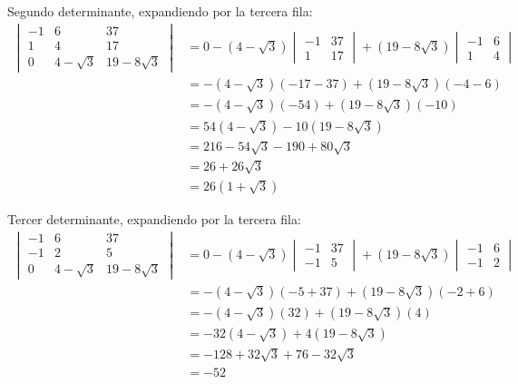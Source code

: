 \documentclass{article}
\begin{document}
Segundo determinante, expandiendo por la tercera fila:
\begin{align}
\begin{vmatrix}
-1 & 6 & 37 \\
1 & 4 & 17 \\
0 & 4-\sqrt{3} & 19-8\sqrt{3}
\end{vmatrix} &= 0 - (4-\sqrt{3}) \begin{vmatrix} -1 & 37 \\ 1 & 17 \end{vmatrix} + (19-8\sqrt{3}) \begin{vmatrix} -1 & 6 \\ 1 & 4 \end{vmatrix} \\
&= -(4-\sqrt{3})(-17-37) + (19-8\sqrt{3})(-4-6) \\
&= -(4-\sqrt{3})(-54) + (19-8\sqrt{3})(-10) \\
&= 54(4-\sqrt{3}) - 10(19-8\sqrt{3}) \\
&= 216 - 54\sqrt{3} - 190 + 80\sqrt{3} \\
&= 26 + 26\sqrt{3} \\
&= 26(1 + \sqrt{3})
\end{align}

Tercer determinante, expandiendo por la tercera fila:
\begin{align}
\begin{vmatrix}
-1 & 6 & 37 \\
-1 & 2 & 5 \\
0 & 4-\sqrt{3} & 19-8\sqrt{3}
\end{vmatrix} &= 0 - (4-\sqrt{3}) \begin{vmatrix} -1 & 37 \\ -1 & 5 \end{vmatrix} + (19-8\sqrt{3}) \begin{vmatrix} -1 & 6 \\ -1 & 2 \end{vmatrix} \\
&= -(4-\sqrt{3})(-5+37) + (19-8\sqrt{3})(-2+6) \\
&= -(4-\sqrt{3})(32) + (19-8\sqrt{3})(4) \\
&= -32(4-\sqrt{3}) + 4(19-8\sqrt{3}) \\
&= -128 + 32\sqrt{3} + 76 - 32\sqrt{3} \\
&= -52
\end{align}
\end{document}
